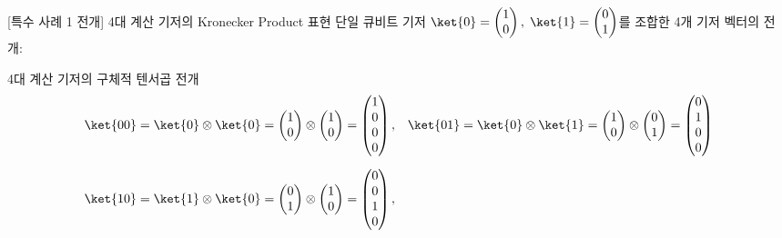 \documentclass[aspectratio=169, 10pt]{beamer}
\begin{document}
\begin{frame}{[특수 사례 1 전개] 4대 계산 기저의 Kronecker Product 표현}
    단일 큐비트 기저 $\ket{0} = \begin{pmatrix} 1 \\ 0 \end{pmatrix}, \; \ket{1} = \begin{pmatrix} 0 \\ 1 \end{pmatrix}$를 조합한 4개 기저 벡터의 전개:
    \vspace{0.15cm}
    \begin{qcblock}{4대 계산 기저의 구체적 텐서곱 전개}
        \begin{align*}
        \ket{00} &= \ket{0} \otimes \ket{0} = \begin{pmatrix} 1 \\ 0 \end{pmatrix} \otimes \begin{pmatrix} 1 \\ 0 \end{pmatrix} = \begin{pmatrix} 1 \\ 0 \\ 0 \\ 0 \end{pmatrix}, &
        \ket{01} &= \ket{0} \otimes \ket{1} = \begin{pmatrix} 1 \\ 0 \end{pmatrix} \otimes \begin{pmatrix} 0 \\ 1 \end{pmatrix} = \begin{pmatrix} 0 \\ 1 \\ 0 \\ 0 \end{pmatrix} \\[6pt]
        \ket{10} &= \ket{1} \otimes \ket{0} = \begin{pmatrix} 0 \\ 1 \end{pmatrix} \otimes \begin{pmatrix} 1 \\ 0 \end{pmatrix} = \begin{pmatrix} 0 \\ 0 \\ 1 \\ 0 \end{pmatrix}, &

\end{align*}
\end{qcblock}
\end{frame}
\end{document}
